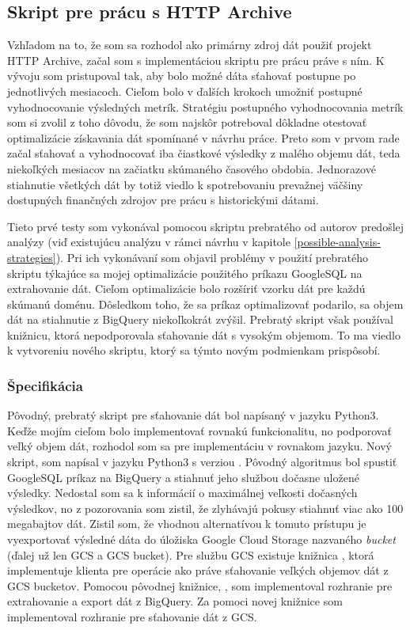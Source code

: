 \subsection{Skript pre prácu s HTTP Archive}
\label{query_and_store}

Vzhľadom na to, že som sa rozhodol ako primárny zdroj dát použiť projekt HTTP Archive, začal som s implementáciou skriptu pre prácu práve s ním.
K vývoju som pristupoval tak, aby bolo možné dáta sťahovať postupne po jednotlivých mesiacoch. 
Cieľom bolo v ďalších krokoch umožniť postupné vyhodnocovanie výsledných metrík. 
Stratégiu postupného vyhodnocovania metrík som si zvolil z toho dôvodu, že som najskôr potreboval dôkladne otestovať optimalizácie získavania dát spomínané v návrhu práce.
Preto som v prvom rade začal sťahovať a vyhodnocovať iba čiastkové výsledky z malého objemu dát, teda niekoľkých mesiacov na začiatku skúmaného časového obdobia.
Jednorazové stiahnutie všetkých dát by totiž viedlo k spotrebovaniu prevažnej väčšiny dostupných finančných zdrojov pre prácu s historickými dátami.

Tieto prvé testy som vykonával pomocou skriptu prebratého od autorov predošlej analýzy (viď existujúcu analýzu v rámci návrhu v kapitole \ref{possible-analysis-strategies}).
Pri ich vykonávaní som objavil problémy v použití prebratého skriptu týkajúce sa mojej optimalizácie použitého príkazu GoogleSQL na extrahovanie dát.
Cieľom optimalizácie bolo rozšíriť vzorku dát pre každú skúmanú doménu.
Dôsledkom toho, že sa príkaz optimalizovať podarilo, sa objem dát na stiahnutie z BigQuery niekoľkokrát zvýšil.
Prebratý skript však používal knižnicu, ktorá nepodporovala sťahovanie dát s vysokým objemom.
To ma viedlo k vytvoreniu nového skriptu, ktorý sa týmto novým podmienkam prispôsobí.

\subsubsection{Špecifikácia}

Pôvodný, prebratý skript pre sťahovanie dát bol napísaný v jazyku Python3.
Keďže mojím cieľom bolo implementovať rovnakú funkcionalitu, no podporovať veľký objem dát, rozhodol som sa pre implementáciu v rovnakom jazyku.
Nový skript,  som napísal v jazyku Python3 s verziou .
Pôvodný algoritmus bol spustiť GoogleSQL príkaz na BigQuery a stiahnuť jeho službou dočasne uložené výsledky.
Nedostal som sa k informácií o maximálnej veľkosti dočasných výsledkov, no z pozorovania som zistil, že zlyhávajú pokusy stiahnuť viac ako 100 megabajtov dát.
Zistil som, že vhodnou alternatívou k tomuto prístupu je vyexportovať výsledné dáta do úložiska Google Cloud Storage nazvaného \textit{bucket} (ďalej už len GCS a GCS bucket).
Pre službu GCS existuje knižnica , ktorá implementuje klienta pre operácie ako práve sťahovanie veľkých objemov dát z GCS bucketov.
Pomocou pôvodnej knižnice, , som implementoval rozhranie pre extrahovanie a export dát z BigQuery.
Za pomoci novej knižnice som implementoval rozhranie pre sťahovanie dát z GCS.

